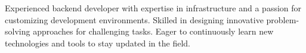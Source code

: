

\begin{cvparagraph}

Experienced backend developer with expertise in infrastructure and a passion for customizing development environments. Skilled in designing innovative problem-solving approaches for challenging tasks. Eager to continuously learn new technologies and tools to stay updated in the field.
\end{cvparagraph}
